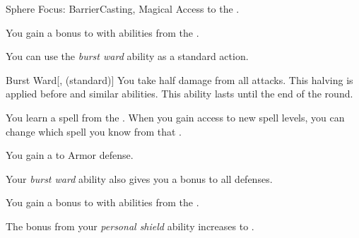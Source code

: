     \begin{feat}{Sphere Focus: Barrier}{Casting, Magical}
        \featpre Access to the  .

         You gain a  bonus to  with abilities from the  .

         You can use the \textit{burst ward} ability as a standard action.
        \begin{freeability}{Burst Ward}[,  (standard)]
            You take half damage from all attacks.
            This halving is applied before  and similar abilities.
            This ability lasts until the end of the round.
        \end{freeability}

         You learn a spell from the  .
        When you gain access to new spell levels, you can change which spell you know from that .

         You gain a   to Armor defense.

         Your \textit{burst ward} ability also gives you a  bonus to all defenses.

         You gain a  bonus to  with abilities from the  .

         The bonus from your \textit{personal shield} ability increases to .
    \end{feat}


